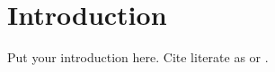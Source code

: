 \section{Introduction} \label{sec:introduction}

Put your introduction here. Cite literate as \cite{ArcticAmplification} or \citep{ArcticAmplification}.